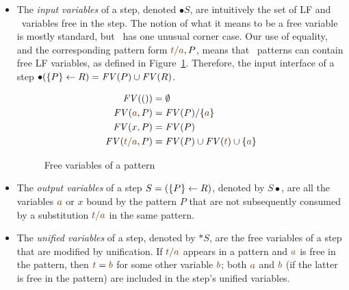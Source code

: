\smallskip
\begin{itemize}
\item The {\it input variables} of a step, denoted ${\bullet}S$, are
  intuitively the set of LF and \sls~variables free in the step. The
  notion of what it means to be a free variable is mostly standard,
  but \sls~has one unusual corner case. Our use of equality, and
  the corresponding pattern form $\lf{t/a}, P$, means that
  \sls~patterns can contain free LF variables, as defined in
  Figure~\ref{fig:freevarspat}.  Therefore, the input interface of a
  step ${\bullet}(\{{P}\} \leftarrow {R}) =  {\it FV}(P) \cup
  {\it FV}(R)$.

\begin{figure}
\begin{align*}
{\it FV}(()) & = \emptyset
\\
{\it FV}(\lf{a}, P) & = {\it FV}(P)/\{\lf{a}\} 
\\
{\it FV}(x, P) & = {\it FV}(P)
\\
{\it FV}(\lf{t/a}, P) & =  {\it FV}(P) \cup {\it FV}(\lf{t}) \cup \{ \lf{a} \}
\end{align*}
\caption{Free variables of a pattern}
\label{fig:freevarspat}
\end{figure}


\item The {\it output variables} of a step $S = (\{{P}\} \leftarrow {R})$,
  denoted by $S{\bullet}$, are all the variables $\lf{a}$ or $x$ bound
  by the pattern $P$ that are not subsequently consumed by a
  substitution $\lf{t/a}$ in the same pattern.

\item The {\it unified variables} of a step, denoted by ${\ast}S$, are
  the free variables of a step that are modified by unification. If
  $\lf{t/a}$ appears in a pattern and $\lf{a}$ is free in the pattern,
  then $\lf{t} = \lf{b}$ for some other variable $\lf{b}$; both
  $\lf{a}$ and $\lf{b}$ (if the latter is free in the pattern) are
  included in the step's unified variables.
\end{itemize}
\smallskip

